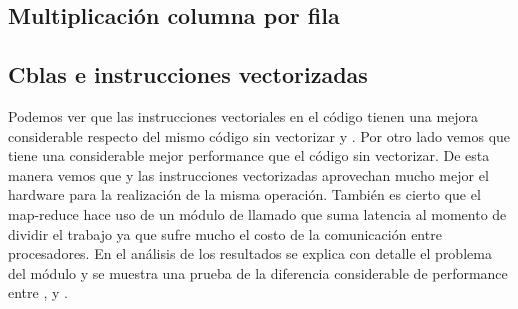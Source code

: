 \subsection{Multiplicación columna por fila}

    \def\model{ColumnByRow}
    \def\analisisAmdahl{
    Podemos observar que el speed up teórico tiende al máximo speed-up
    mientras que el real nos muestra que no usa toda la paralelizacion ya que al
    pasar de 1 a 2 threads, el tiempo no cae a la mitad, y al pasar de 1 a 4 threads
    no cae a la cuarta parte. Se puede ver que tiene un speed-up de casi 2 lo
    cual quiere decir que hace uso de la mitad.
    }
    \def\analisisGustafson{
    Podemos ver que estos resultados demuestran que la sección serie del
    problema se mantiene casi constante respecto de la sección paralela
    que varía en forma ascendente con el tamaño de los datos de entrada.
    Pero además podemos observar que hay mucha ineficiencia respecto del uso de
    la paralelización ya que al aumentar el trabajo en casi el doble usando
    dos procesadores debería tardar aproximadamente lo mismo. Sin embargo vemos
    que el tiempo paralelo se duplicó, lo cual muestra que hay un problema de
    comunicación al aumentar el paralelismo. Mas adelante explicaremos que el
    módulo Pool es ineficiente respecto del uso de recursos
    }
    
    \newpage
    \clearpage

\subsection{Cblas e instrucciones vectorizadas}
    \def\text{Tiempo serie de multiplicación en segundos}
    \def\path{dgemm.png}
    \def\scale{.6}
    

    Podemos ver que las instrucciones vectoriales en el código
     tienen una mejora considerable respecto del mismo
    código sin vectorizar y . Por otro lado vemos que 
    tiene una considerable mejor performance que el código
     sin vectorizar.
    De esta manera vemos que  y las instrucciones vectorizadas
    aprovechan mucho mejor el hardware para la realización de la misma operación.
    También es cierto que el map-reduce hace uso de un módulo de 
    llamado  que suma latencia al momento de dividir el trabajo ya
    que sufre mucho el costo de la comunicación entre procesadores. En el análisis
    de los resultados se explica con detalle el problema del módulo 
    y se muestra una prueba de la diferencia considerable de performance entre
    ,  y .
